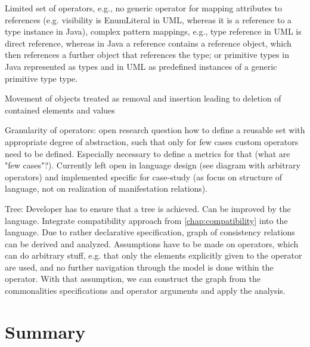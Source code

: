 Limited set of operators, e.g., no generic operator for mapping attributes to references (e.g. visibility is EnumLiteral in UML, whereas it is a reference to a type instance in Java), complex pattern mappings, e.g., type reference in UML is direct reference, whereas in Java a reference contains a reference object, which then references a further object that references the type; or primitive types in Java represented as types and in UML as predefined instances of a generic primitive type type.

Movement of objects treated as removal and insertion leading to deletion of contained elements and values


Granularity of operators: open research question how to define a reusable set with appropriate degree of abstraction, such that only for few cases custom operators need to be defined. Especially necessary to define a metrics for that (what are "few cases"?). Currently left open in language design (see diagram with arbitrary operators) and implemented specific for case-study (as focus on structure of language, not on realization of manifestation relations).

Tree: Developer has to ensure that a tree is achieved. Can be improved by the language. Integrate compatibility approach from \autoref{chap:compatibility} into the language. Due to rather declarative specification, graph of consistency relations can be derived and analyzed. Assumptions have to be made on operators, which can do arbitrary stuff, e.g. that only the elements explicitly given to the operator are used, and no further navigation through the model is done within the operator. With that assumption, we can construct the graph from the commonalities specifications and operator arguments and apply the analysis.


\section{Summary}



